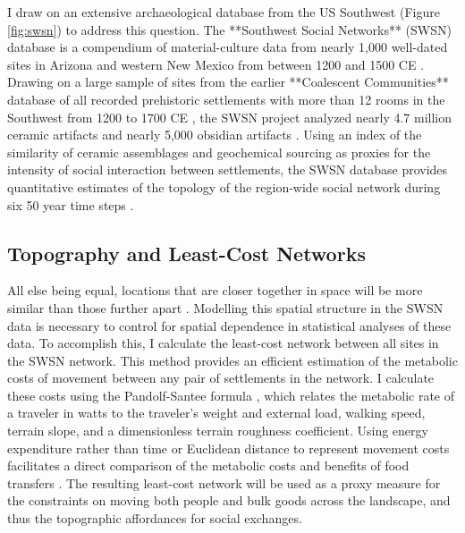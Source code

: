 \documentclass[fleqn,10pt]{wlscirep}
\begin{document}
I draw on an extensive archaeological database from the US Southwest (Figure \ref{fig:swsn}) to address this question. The **Southwest Social Networks** (SWSN) database is a compendium of material-culture data from nearly 1,000 well-dated sites in Arizona and western New Mexico from between 1200 and 1500 CE \cite{Mills2012,Mills2013a,Peeples2013,Borck2015,Hill2015,Mills2015a}. Drawing on a large sample of sites from the earlier **Coalescent Communities** database of all recorded prehistoric settlements with more than 12 rooms in the Southwest from 1200 to 1700 CE \cite{Hill2004}, the SWSN project analyzed nearly 4.7 million ceramic artifacts and nearly 5,000 obsidian artifacts \cite{Mills2015a}. Using an index of the similarity of ceramic assemblages and geochemical sourcing as proxies for the intensity of social interaction between settlements, the SWSN database provides quantitative estimates of the topology of the region-wide social network during six 50 year time steps \cite{Mills2013a}.

\subsection*{Topography and Least-Cost Networks}
All else being equal, locations that are closer together in space will be more similar than those further apart \cite{Tobler1970}. Modelling this spatial structure in the SWSN data is necessary to control for spatial dependence in statistical analyses of these data. To accomplish this, I calculate the least-cost network between all sites in the SWSN network. This method provides an efficient estimation of the metabolic costs of movement between any pair of settlements in the network. I calculate these costs using the Pandolf-Santee formula \cite{White2012}, which relates the metabolic rate of a traveler in watts to the traveler's weight and external load, walking speed, terrain slope, and a dimensionless terrain roughness coefficient. Using energy expenditure rather than time or Euclidean distance to represent movement costs facilitates a direct comparison of the metabolic costs and benefits of food transfers  \cite{Drennan1984}. The resulting least-cost network will be used as a proxy measure for the constraints on moving both people and bulk goods across the landscape, and thus the topographic affordances for social exchanges.
\end{document}
